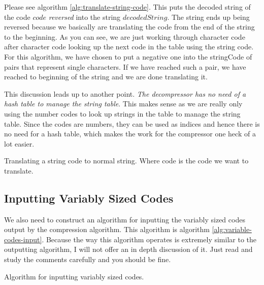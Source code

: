 \begin{refsection}
Please see algorithm \ref{alg:translate-string-code}. This puts the
decoded string of the code $code$ \textit{reversed} into the string
$decodedString$. The string ends up being reversed because we
basically are translating the code from the end of the string to the
beginning. As you can see, we are just working through character code
after character code looking up the next code in the table using the
string code. For this algorithm, we have chosen to put a negative one
into the stringCode of pairs that represent single characters. If we
have reached such a pair, we have reached to beginning of the string
and we are done translating it.

This discussion leads up to another point. \textit{The decompressor
  has no need of a hash table to manage the string table}. This makes sense as
we are really only using the number codes to look up strings in the
table to manage the string table. Since the codes are numbers, they
can be used as indices and hence there is no need for a hash table,
which makes the work for the compressor one heck of a lot easier.

\begin{algorithm}[H]
  \caption{Translating a string code to normal string. Where code is
    the code we want to translate. }
  \label{alg:translate-string-code}
  \begin{algorithmic}[1]
    \While{\True}
        \Break
      \Else
      \EndIf
    \EndWhile
  \end{algorithmic}
\end{algorithm}

\subsection{Inputting Variably Sized Codes}

We also need to construct an algorithm for inputting the variably
sized codes output by the compression algorithm. This algorithm is
algorithm \ref{alg:variable-codes-input}. Because the way this algorithm operates is extremely
similar to the outputting algorithm, I will not offer an in depth
discussion of it. Just read and study the comments carefully and you
should be fine.

\begin{algorithm}[H]
  \caption{Algorithm for inputting variably sized codes.}
  \label{alg:variable-codes-input}
  \begin{algorithmic}[1]


\end{algorithmic}
\end{algorithm}
\end{refsection}
